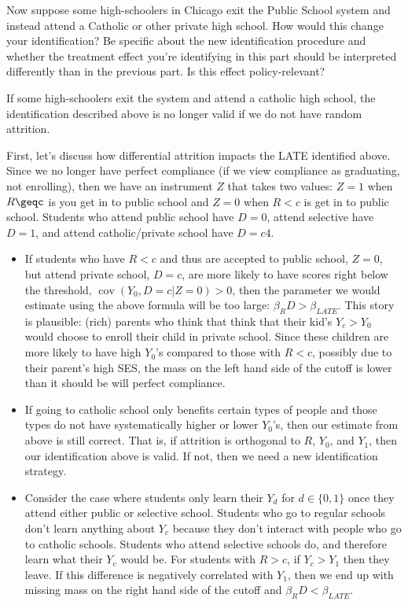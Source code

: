 \documentclass{article}
\begin{document}
\begin{problem}{3}
Now suppose some high-schoolers in Chicago exit the Public School system and instead attend a Catholic or other private high school. How would this change your identification? Be specific about the new identification procedure and whether the treatment effect you're identifying in this part should be interpreted differently than in the previous part. Is this effect policy-relevant?
\end{problem}
\begin{solution}

If some high-schoolers exit the system and attend a catholic high school, the identification described above is no longer valid if we do not have random attrition. 

First, let's discuss how differential attrition impacts the LATE identified above. Since we no longer have perfect compliance (if we view compliance as graduating, not enrolling), then we have an instrument $Z$ that takes two values: $Z=1$ when $R\geqc$ is you get in to public school and $Z=0$ when $R<c$ is get in to public school. Students who attend public school have $D=0$, attend selective have $D=1$, and attend catholic/private school have $D=c4$. 
\begin{itemize}
    \item If students who have $R<c$ and thus are accepted to public school, $Z=0$, but attend private school, $D=c$, are more likely to have scores right below the threshold, $\operatorname{cov}(Y_0,D=c|Z=0)>0$, then the parameter we would estimate using the above formula will be too large: $\beta_RD > \beta_{LATE}$. This story is plausible: (rich) parents who think that think that their kid's $Y_c>Y_0$ would choose to enroll their child in private school. Since these children are more likely to have high $Y_0$'s compared to those with $R<c$, possibly due to their parent's high SES, the mass on the left hand side of the cutoff is lower than it should be will perfect compliance. 
    \item If going to catholic school only benefits certain types of people and those types do not have systematically higher or lower $Y_0$'s, then our estimate from above is still correct. That is, if attrition is orthogonal to $R$, $Y_0$, and $Y_1$, then our identification above is valid. If not, then we need a new identification strategy.
    \item Consider the case where students only learn their $Y_d$ for $d\in \{0,1\}$ once they attend either public or selective school. Students who go to regular schools don't learn anything about $Y_c$ because they don't interact with people who go to catholic schools. Students who attend selective schools do, and therefore learn what their $Y_c$ would be. For students with $R>c$, if $Y_c>Y_1$ then they leave. If this difference is negatively correlated with $Y_1$, then we end up with missing mass on the right hand side of the cutoff and $\beta_RD < \beta_{LATE}$.
\end{itemize}


\end{solution}
\end{document}
